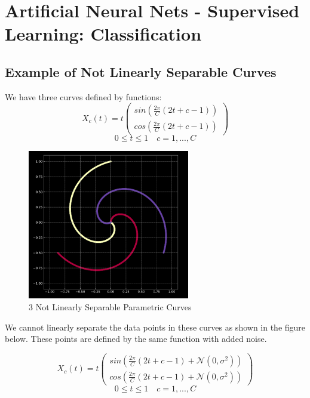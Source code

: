 \chapter{Artificial Neural Nets - Supervised Learning: Classification }

\section{Example of Not Linearly Separable Curves}


We have three curves defined by functions:
\[X_c(t) = t
\begin{pmatrix}
    sin( \frac{2 \pi}{C}(2t + c -1)) \\
    cos( \frac{2 \pi}{C}(2t + c -1))
\end{pmatrix}
 \]
\[ 0 \leq t \leq 1 \quad c = 1,..., C\]

\begin{figure}[h]
    \centering
    \includegraphics[width=200pt]{labs/02/images/spiral1.png}
    \caption{3 Not Linearly Separable Parametric Curves}
    \label{fig:my_label}
\end{figure}


We cannot linearly separate the data points in these curves as shown in the figure below.  These points are defined by the same function with added noise.

\[X_c(t) = t
\begin{pmatrix}
    sin( \frac{2 \pi}{C}(2t + c -1) + \mathcal{N} (0, \sigma ^2 )) \\
    cos( \frac{2 \pi}{C}(2t + c -1) + \mathcal{N} (0, \sigma ^2 ) )
\end{pmatrix}
 \]
\[ 0 \leq t \leq 1 \quad c = 1,..., C\]
